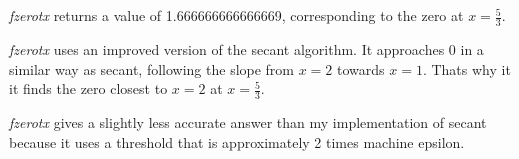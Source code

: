 \documentclass[12pt]{article}
\begin{document}
\subsection{}

\textit{fzerotx} returns a value of 1.666666666666669, corresponding to the zero at $x = \frac{5}{3}$.

\textit{fzerotx} uses an improved version of the secant algorithm. It approaches 0 in a similar way as secant, following the slope from $x=2$ towards $x=1$. Thats why it it finds the zero closest to $x=2$ at $x = \frac{5}{3}$.

\textit{fzerotx} gives a slightly less accurate answer than my implementation of secant because it uses a threshold that is approximately 2 times machine epsilon.
\end{document}
